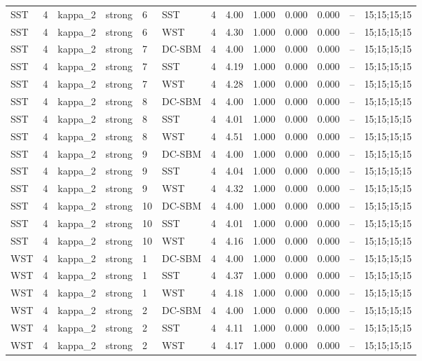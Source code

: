 \begin{table}[!h]
\begin{tabular}[t]{lllllllllllll}
SST & 4 & kappa_2 & strong & 6 & SST & 4 & 4.00 & 1.000 & 0.000 & 0.000 & -- & 15;15;15;15\\
SST & 4 & kappa_2 & strong & 6 & WST & 4 & 4.30 & 1.000 & 0.000 & 0.000 & -- & 15;15;15;15\\
SST & 4 & kappa_2 & strong & 7 & DC-SBM & 4 & 4.00 & 1.000 & 0.000 & 0.000 & -- & 15;15;15;15\\
SST & 4 & kappa_2 & strong & 7 & SST & 4 & 4.19 & 1.000 & 0.000 & 0.000 & -- & 15;15;15;15\\
SST & 4 & kappa_2 & strong & 7 & WST & 4 & 4.28 & 1.000 & 0.000 & 0.000 & -- & 15;15;15;15\\
SST & 4 & kappa_2 & strong & 8 & DC-SBM & 4 & 4.00 & 1.000 & 0.000 & 0.000 & -- & 15;15;15;15\\
SST & 4 & kappa_2 & strong & 8 & SST & 4 & 4.01 & 1.000 & 0.000 & 0.000 & -- & 15;15;15;15\\
SST & 4 & kappa_2 & strong & 8 & WST & 4 & 4.51 & 1.000 & 0.000 & 0.000 & -- & 15;15;15;15\\
SST & 4 & kappa_2 & strong & 9 & DC-SBM & 4 & 4.00 & 1.000 & 0.000 & 0.000 & -- & 15;15;15;15\\
SST & 4 & kappa_2 & strong & 9 & SST & 4 & 4.04 & 1.000 & 0.000 & 0.000 & -- & 15;15;15;15\\
SST & 4 & kappa_2 & strong & 9 & WST & 4 & 4.32 & 1.000 & 0.000 & 0.000 & -- & 15;15;15;15\\
SST & 4 & kappa_2 & strong & 10 & DC-SBM & 4 & 4.00 & 1.000 & 0.000 & 0.000 & -- & 15;15;15;15\\
SST & 4 & kappa_2 & strong & 10 & SST & 4 & 4.01 & 1.000 & 0.000 & 0.000 & -- & 15;15;15;15\\
SST & 4 & kappa_2 & strong & 10 & WST & 4 & 4.16 & 1.000 & 0.000 & 0.000 & -- & 15;15;15;15\\
WST & 4 & kappa_2 & strong & 1 & DC-SBM & 4 & 4.00 & 1.000 & 0.000 & 0.000 & -- & 15;15;15;15\\
WST & 4 & kappa_2 & strong & 1 & SST & 4 & 4.37 & 1.000 & 0.000 & 0.000 & -- & 15;15;15;15\\
WST & 4 & kappa_2 & strong & 1 & WST & 4 & 4.18 & 1.000 & 0.000 & 0.000 & -- & 15;15;15;15\\
WST & 4 & kappa_2 & strong & 2 & DC-SBM & 4 & 4.00 & 1.000 & 0.000 & 0.000 & -- & 15;15;15;15\\
WST & 4 & kappa_2 & strong & 2 & SST & 4 & 4.11 & 1.000 & 0.000 & 0.000 & -- & 15;15;15;15\\
WST & 4 & kappa_2 & strong & 2 & WST & 4 & 4.17 & 1.000 & 0.000 & 0.000 & -- & 15;15;15;15\\

\end{tabular}
\end{table}
